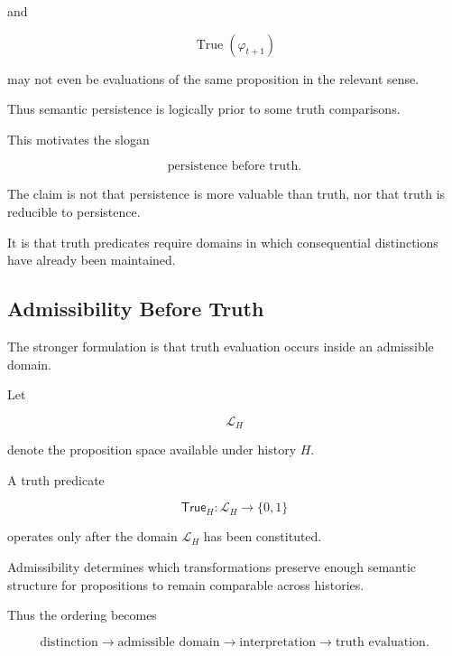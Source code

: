\documentclass[11pt]{article}
\theoremstyle{remark}
\begin{document}
and

\begin{equation}
\operatorname{True}(\varphi_{t+1})
\end{equation}

may not even be evaluations of the same proposition in the relevant sense.

Thus semantic persistence is logically prior to some truth comparisons.

This motivates the slogan

\begin{equation}
\boxed{
\text{persistence before truth}.
}
\end{equation}

The claim is not that persistence is more valuable than truth, nor that truth is reducible to persistence.

It is that truth predicates require domains in which consequential distinctions have already been maintained.

\subsection{Admissibility Before Truth}

The stronger formulation is that truth evaluation occurs inside an admissible domain.

Let

\begin{equation}
\mathcal{L}_H
\end{equation}

denote the proposition space available under history $H$.

A truth predicate

\begin{equation}
\mathsf{True}_H:
\mathcal{L}_H
\rightarrow
\{0,1\}
\end{equation}

operates only after the domain $\mathcal{L}_H$ has been constituted.

Admissibility determines which transformations preserve enough semantic structure for propositions to remain comparable across histories.

Thus the ordering becomes

\begin{equation}
\text{distinction}
\rightarrow
\text{admissible domain}
\rightarrow
\text{interpretation}
\rightarrow
\text{truth evaluation}.
\end{equation}
\end{document}
